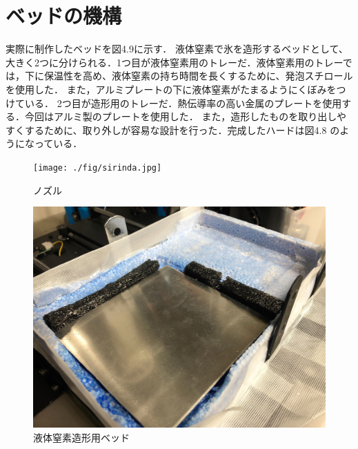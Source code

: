 \section{ベッドの機構}
\label{sec:paragraph}
実際に制作したベッドを図4.9に示す．
液体窒素で氷を造形するベッドとして、大きく2つに分けられる．1つ目が液体窒素用のトレーだ．液体窒素用のトレーでは，下に保温性を高め、液体窒素の持ち時間を長くするために、発泡スチロールを使用した．
また，アルミプレートの下に液体窒素がたまるようにくぼみをつけている．
2つ目が造形用のトレーだ．熱伝導率の高い金属のプレートを使用する．今回はアルミ製のプレートを使用した．
また，造形したものを取り出しやすくするために、取り外しが容易な設計を行った．完成したハードは図4.8 のようになっている．

\begin{figure}[H]
  \centering
  \texttt{[image: ./fig/sirinda.jpg]}
  \caption{ノズル}
  \label{fig:stage}
\end{figure}

\begin{figure}[H]
  \centering
  \includegraphics[width=10truecm]{./fig/stage.jpg}
  \caption{液体窒素造形用ベッド}
  \label{fig:stage}
\end{figure}

